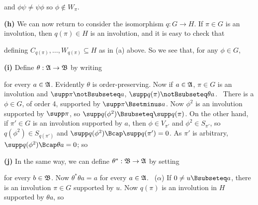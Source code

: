 {\noindent and $\phi\psi\ne\psi\phi$ so $\phi\notin W_{\pi}$.\ \Qed
     
\medskip
     
{\bf (h)} We can now return to consider the isomorphism $q:G\to H$.
If $\pi\in G$ is an involution, then $q(\pi)\in H$ is an involution, and
it is easy to check that
     
     
     
     
     
\noindent defining $C_{q(\pi)},\ldots,W_{q(\pi)}\subseteq H$ as in (a)
above.
So we see that, for any $\phi\in G$,
     
     
\medskip
     
{\bf (i)} Define $\theta:\frak A\to\frak B$ by writing
     
     
\noindent for every $a\in\frak A$.   Evidently $\theta$ is
order-preserving.   Now if $a\in\frak A$, $\pi\in G$ is an involution
and $\supp\pi\notBsubseteq a$, $\supp q(\pi)\notBsubseteq\theta a$.
\Prf\    There is a  $\phi\in G$, of order 4, supported by
$\supp\pi\Bsetminus a$.  Now $\phi^2$ is an involution supported by
$\supp\pi$, so $\supp q(\phi^2)\Bsubseteq\discretionary{}{}{}\supp q(\pi)$.
On the other
hand, if $\pi'\in G$ is an involution supported by $a$, then 
$\phi\in V_{\pi'}$ and $\phi^2\in S_{\pi'}$, so 
$q(\phi^2)\in S_{q(\pi')}$ and
$\supp q(\phi^2)\Bcap\supp q(\pi')=0$.   As $\pi'$ is arbitrary, $\supp
q(\phi^2)\Bcap\theta a=0$;  so
     
     
     
{\bf (j)} In the same way, we can define $\theta^*:\frak B\to\frak A$ by
setting
     
     
\noindent for every $b\in\frak B$.   Now $\theta^*\theta a=a$ for every
$a\in\frak A$.   \Prf\ ($\alpha$) If $0\ne u\Bsubseteq
a$, there is an involution $\pi\in G$ supported by $u$.   Now $q(\pi)$
is an involution in $H$ supported by $\theta a$, so
     
}
